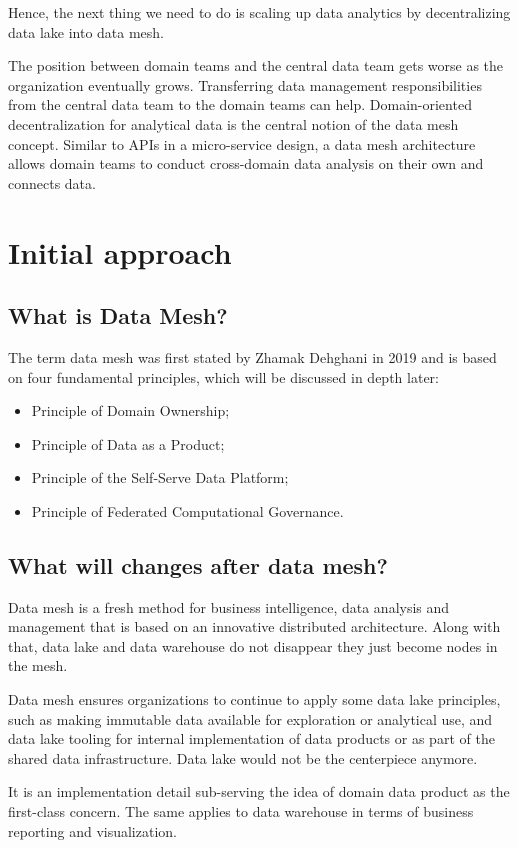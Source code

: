 \documentclass[12pt, a4paper]{book}
\begin{document}
Hence, the next thing we need to do is scaling up data analytics by decentralizing data lake into data mesh.\cite{datameshweb}

The position between domain teams and the central data team gets worse as the organization eventually grows. Transferring data management responsibilities from the central data team to the domain teams can help. Domain-oriented decentralization for analytical data is the central notion of the data mesh concept. Similar to APIs in a micro-service design, a data mesh architecture allows domain teams to conduct cross-domain data analysis on their own and connects data.

\section{Initial approach}
\subsection{What is Data Mesh?}
The term data mesh was first stated by Zhamak Dehghani in 2019 and is based on four fundamental principles, which will be discussed in depth later:
	\begin{itemize}
		\item Principle of Domain Ownership;
		\item Principle of Data as a Product;
		\item Principle of the Self-Serve Data Platform;
		\item Principle of Federated Computational Governance.
	\end{itemize}


\subsection{What will changes after data mesh?}
Data mesh is a fresh method for business intelligence, data analysis and management that is based on an innovative distributed architecture. Along with that, data lake and data warehouse do not disappear they just become nodes in the mesh. \cite{machado2022data,shiftkpmg}

Data mesh ensures organizations to continue to apply some data lake principles, such as making immutable data available for exploration or analytical use, and data lake tooling for internal implementation of data products or as part of the shared data infrastructure. Data lake would not be the centerpiece anymore.

It is an implementation detail sub-serving the idea of domain data product as the first-class concern. The same applies to data warehouse in terms of business reporting and visualization. \cite{shiftkpmg}
\end{document}
